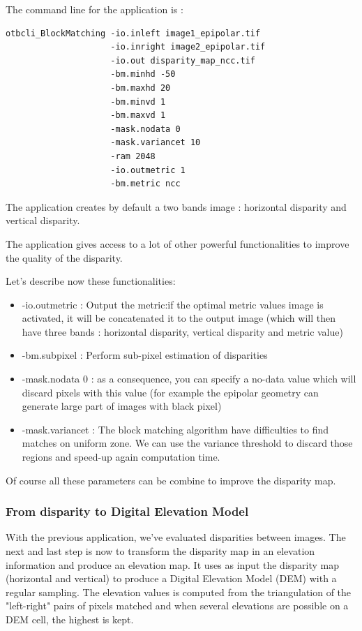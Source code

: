 The command line for the  application is :
\begin{verbatim}
otbcli_BlockMatching -io.inleft image1_epipolar.tif
                     -io.inright image2_epipolar.tif
                     -io.out disparity_map_ncc.tif
                     -bm.minhd -50
                     -bm.maxhd 20
                     -bm.minvd 1
                     -bm.maxvd 1
                     -mask.nodata 0
                     -mask.variancet 10
                     -ram 2048
                     -io.outmetric 1
                     -bm.metric ncc
\end{verbatim}

The application creates by default a two bands image : horizontal disparity and
vertical disparity.

The  application gives access to a lot of other
powerful functionalities to improve the quality of the disparity.

Let's describe now these functionalities:

\begin{itemize}
\item -io.outmetric : Output the metric:if the optimal metric values image is
  activated, it will be concatenated it to the output image (which will then
  have three bands : horizontal disparity, vertical disparity and metric value)
\item -bm.subpixel : Perform sub-pixel estimation of disparities
\item -mask.nodata 0 : as a consequence, you can specify a no-data value which
  will discard pixels with this value (for example the epipolar geometry can
  generate large part of images with black pixel)
\item -mask.variancet : The block matching algorithm have difficulties to find
  matches on uniform zone. We can use the variance threshold to discard those
  regions and speed-up again computation time.
\end{itemize}

Of course all these parameters can be combine to improve the disparity map.

\subsubsection{From disparity to Digital Elevation Model}

With the previous application, we've evaluated disparities between images. The
next and last step is now to transform the disparity map in an elevation
information and produce an elevation map.  It uses as input the disparity map
(horizontal and vertical) to produce a Digital Elevation Model (DEM) with a
regular sampling. The elevation values is computed from the triangulation of the
"left-right" pairs of pixels matched and when several elevations are possible on
a DEM cell, the highest is kept.

